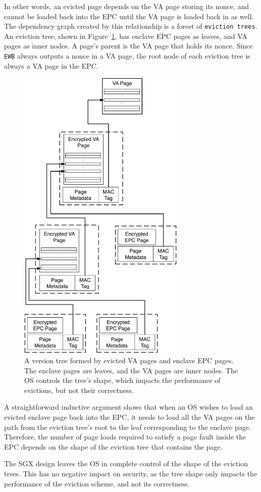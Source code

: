 In other words, an evicted page depends on the VA page storing its nonce, and
cannot be loaded back into the EPC until the VA page is loaded back in as well.
The dependency graph created by this relationship is a forest of
\texttt{eviction trees}. An eviction tree, shown in
Figure~\ref{fig:sgx_eviction_tree}, has enclave EPC pages as leaves, and VA
pages as inner nodes. A page's parent is the VA page that holds its nonce.
Since \texttt{EWB} always outputs a nonce in a VA page, the root node of each
eviction tree is always a VA page in the EPC.

\begin{figure}[hbt]
  \centering
  \includegraphics[width=80mm]{figures/sgx_eviction_tree.pdf}
  \caption{
    A version tree formed by evicted VA pages and enclave EPC pages. The
    enclave pages are leaves, and the VA pages are inner nodes. The OS controls
    the tree's shape, which impacts the performance of evictions, but not their
    correctness.
  }
  \label{fig:sgx_eviction_tree}
\end{figure}

A straightforward inductive argument shows that when an OS wishes to load an
evicted enclave page back into the EPC, it needs to load all the VA pages on
the path from the eviction tree's root to the leaf corresponding to the enclave
page. Therefore, the number of page loads required to satisfy a page fault
inside the EPC depends on the shape of the eviction tree that contains the
page.

The SGX design leaves the OS in complete control of the shape of the eviction
trees. This has no negative impact on security, as the tree shape only impacts
the performance of the eviction scheme, and not its correctness.
